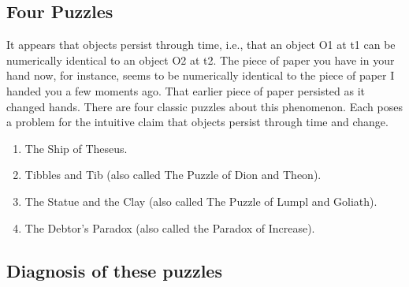 \documentclass[oneside]{article}
\begin{document}
\subsection*{Four Puzzles} 
It appears that objects persist through time, i.e., that an object O1 at t1 can be numerically identical to an object O2 at t2. The piece of paper you have in your hand now, for instance, seems to be numerically identical to the piece of paper I handed you a few moments ago. That earlier piece of paper persisted as it changed hands. There are four classic puzzles about this phenomenon. Each poses a problem for the intuitive claim that objects persist through time and change. 

\begin{enumerate}
\item The Ship of Theseus. 
\item Tibbles and Tib (also called The Puzzle of Dion and Theon).
\item The Statue and the Clay (also called The Puzzle of Lumpl and Goliath).
\item The Debtor's Paradox (also called the Paradox of Increase). 

\end{enumerate}

\subsection*{Diagnosis of these puzzles}
\end{document}
